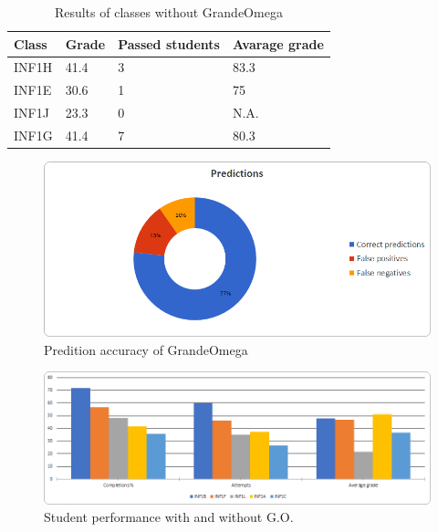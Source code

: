 \begin{table}
	\begin{tabular}{|p{}|p{}|p{}|p{}|}
		\hline
		\textbf{Class} & \textbf{Grade} & \textbf{Passed students} & \textbf{Avarage grade} \\
		\hline
		INF1H & 41.4 & 3 & 83.3 \\
		\hline
		INF1E & 30.6 & 1 & 75 \\
		\hline
		INF1J & 23.3 & 0 & N.A. \\
		\hline
		INF1G & 41.4 & 7 & 80.3 \\
		\hline
	\end{tabular}
	\caption{Results of classes without GrandeOmega}
	\label{tab:performance_no_go}
\end{table}

\begin{figure}
	\includegraphics[width = \textwidth]{Figures/prediction}
	\caption{Predition accuracy of GrandeOmega}
	\label{fig:prediction}
\end{figure}

\begin{figure}
	\includegraphics[width = \textwidth]{Figures/bar_chart}
	\caption{Student performance with and without G.O.}
	\label{fig:bar_chart}
\end{figure}